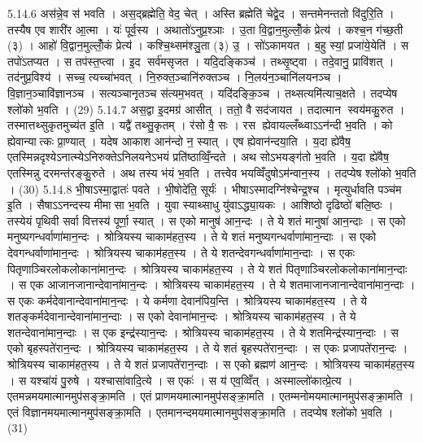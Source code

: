 5.14.6
अस॑न्ने॒व स॑ भवति । अस॒द्ब्रह्मेति॒ वेद॒ चेत् । अस्ति ब्रह्मेति॑ चेद्वे॒द । सन्तमेनन्ततो वि॑दुरि॒ति । तस्यैष एव शारी॑र आ॒त्मा । यः॑ पूर्व॒स्य । अथातो॑ऽनुप्र॒श्ञाः । उ॒ता वि॒द्वान॒मुल्लोँ॒कं प्रेत्य॑ । कश्च॒न ग॑च्छ॒ती (३) । आहो॑ वि॒द्वान॒मुल्लोँ॒कं प्रेत्य॑ । कश्चि॒थ्सम॑श्ञु॒ता (३) उ॒ । सो॑ऽकामयत । ब॒हु स्यां॒ प्रजा॑ये॒येति॑ । स तपो॑ऽतप्यत । स तप॑स्त॒प्त्वा । इ॒द सर्व॑मसृजत । यदि॒दङ्किञ्च॑ । तथ्सृ॒ष्ट्वा । तदे॒वानु॒ प्रावि॑शत् । तद॑नुप्र॒विश्य॑ । सच्च॒ त्यच्चा॑भवत् । नि॒रुक्त॒ञ्चानि॑रुक्तञ्च । नि॒लय॑न॒ञ्चानि॑लयनञ्च । वि॒ज्ञान॒ञ्चावि॑ज्ञानञ्च । सत्यञ्चानृतञ्च स॑त्यम॒भवत् । यदि॑दङ्कि॒ञ्च । तथ्सत्यमि॑त्याच॒क्षते । तदप्येष श्लो॑को भ॒वति । (29)
5.14.7
अस॒द्वा इ॒दमग्र॑ आसीत् । ततो॒ वै सद॑जायत । तदात्मान स्वय॑मकु॒रुत । तस्मात्तथ्सुकृतमुच्य॑त इ॒ति । यद्वै॑ तथ्सु॒कृतम् । र॑सो वै॒ सः । रस ह्येवायल्लँब्ध्वाऽऽन॑न्दी भ॒वति । को ह्येवान्यात्कः प्रा॒ण्यात् । यदेष आकाश आन॑न्दो न॒ स्यात् । एष ह्येवान॑न्दया॒ति । य॒दा ह्ये॑वैष॒ एतस्मिन्नदृश्येऽनात्म्येऽनिरुक्तेऽनिलयनेऽभयं प्रति॑ष्ठाव्विँ॒न्दते । अथ सोऽभयङ्ग॑तो भ॒वति । य॒दा ह्ये॑वैष॒ एतस्मिन्नु दरमन्त॑रङ्कु॒रुते । अथ तस्य भ॑यं भ॒वति । तत्त्वेव भयव्विँदुषोऽम॑न्वान॒स्य । तदप्येष श्लो॑को भ॒वति । (30)
5.14.8
भी॒षाऽस्मा॒द्वातः॑ पवते । भी॒षोदे॑ति॒ सूर्यः॑ । भीषाऽस्मादग्नि॑श्चेन्द्र॒श्च । मृत्युर्धावति पञ्च॑म इ॒ति । सैषाऽऽनन्दस्य मीमा॑सा भ॒वति । युवा स्याथ्साधु यु॑वाऽद्ध्या॒यकः । आशिष्ठो दृढिष्ठो॑ बलि॒ष्ठः । तस्येयं पृथिवी सर्वा वित्तस्य॑ पूर्णा॒ स्यात् । स एको मानुष॑ आन॒न्दः । ते ये शतं मानुषा॑ आन॒न्दाः । स एको मनुष्यगन्धर्वाणा॑मान॒न्दः । श्रोत्रियस्य चाकाम॑हत॒स्य । ते ये शतं मनुष्यगन्धर्वाणा॑मान॒न्दाः । स एको देवगन्धर्वाणा॑मान॒न्दः । श्रोत्रियस्य चाकाम॑हत॒स्य । ते ये शतन्देवगन्धर्वाणा॑मान॒न्दाः । स एकः पितृणाञ्चिरलोकलोकाना॑मान॒न्दः । श्रोत्रियस्य चाकाम॑हत॒स्य । ते ये शतं पितृणाञ्चिरलोकलोकाना॑मान॒न्दाः । स एक आजानजानान्देवाना॑मान॒न्दः । श्रोत्रियस्य चाकाम॑हत॒स्य । ते ये शतमाजानजानान्देवाना॑मान॒न्दाः । स एकः कर्मदेवानान्देवाना॑मान॒न्दः । ये कर्मणा देवान॑पिय॒न्ति । श्रोत्रियस्य चाकाम॑हत॒स्य । ते ये शतङ्कर्मदेवानान्देवाना॑मान॒न्दाः । स एको देवाना॑मान॒न्दः । श्रोत्रियस्य चाकाम॑हत॒स्य । ते ये शतन्देवाना॑मान॒न्दाः । स एक इन्द्र॑स्यान॒न्दः । श्रोत्रियस्य चाकाम॑हत॒स्य । ते ये शतमिन्द्र॑स्यान॒न्दाः । स एको बृहस्पते॑रान॒न्दः । श्रोत्रियस्य चाकाम॑हत॒स्य । ते ये शतं बृहस्पते॑रान॒न्दाः । स एकः प्रजापते॑रान॒न्दः । श्रोत्रियस्य चाकाम॑हत॒स्य । ते ये शतं प्रजापते॑रान॒न्दाः । स एको ब्रह्मण॑ आन॒न्दः । श्रोत्रियस्य चाकाम॑हत॒स्य । स यश्चा॑यं पु॒रुषे । यश्चासा॑वादि॒त्ये । स एकः॑ । स य॑ एव॒व्विँत् । अस्माल्लो॑कात्प्रे॒त्य । एतमन्नमयमात्मानमुप॑सङ्क्रा॒मति । एतं प्राणमयमात्मानमुप॑सङ्क्रा॒मति । एतम्मनोमयमात्मानमुप॑सङ्क्रा॒मति । एतं विज्ञानमयमात्मानमुप॑सङ्क्रा॒मति । एतमानन्दमयमात्मानमुप॑सङ्क्रा॒मति । तदप्येष श्लो॑को भ॒वति । (31)
